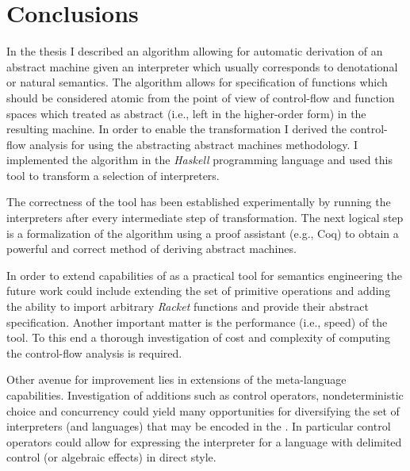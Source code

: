 \chapter{Conclusions}\label{chapter:conclusions}
In the thesis I described an algorithm allowing for automatic derivation of an abstract machine given an interpreter which usually corresponds to denotational or natural semantics.
The algorithm allows for specification of functions which should be considered atomic from the point of view of control-flow and function spaces which treated as abstract (i.e., left in the higher-order form) in the resulting machine.
In order to enable the transformation I derived the control-flow analysis for \IDL{} using the abstracting abstract machines methodology.
I implemented the algorithm in the \textit{Haskell} programming language and used this tool to transform a selection of interpreters.

The correctness of the tool has been established experimentally by running the interpreters after every intermediate step of transformation.
The next logical step is a formalization of the algorithm using a proof assistant (e.g., Coq) to obtain a powerful and correct method of deriving abstract machines.

In order to extend capabilities of \semt{} as a practical tool for semantics engineering the future work could include extending the set of primitive operations and adding the ability to import arbitrary \textit{Racket} functions and provide their abstract specification.
Another important matter is the performance (i.e., speed) of the tool.
To this end a thorough investigation of cost and complexity of computing the control-flow analysis is required.

Other avenue for improvement lies in extensions of the meta-language capabilities.
Investigation of additions such as control operators, nondeterministic choice and concurrency could yield many opportunities for diversifying the set of interpreters (and languages) that may be encoded in the \IDL{}.
In particular control operators could allow for expressing the interpreter for a language with delimited control (or algebraic effects) in direct style.